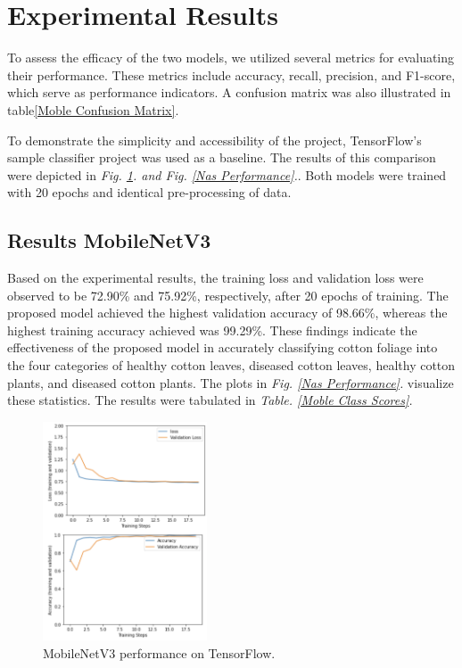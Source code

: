 \documentclass[conference]{IEEEtran}
\begin{document}
\section{Experimental Results}
To assess the efficacy of the two models, we utilized several metrics for evaluating their performance. These metrics include accuracy, recall, precision, and F1-score, which serve as performance indicators. A confusion matrix was also illustrated in table\ref{Moble Confusion Matrix}.


To demonstrate the simplicity and accessibility of the project, TensorFlow's sample classifier project was used as a baseline. The results of this comparison were depicted in \emph{Fig. \ref{Moble Perform}. and Fig. \ref{Nas Performance}.}. Both models were trained with 20 epochs and identical pre-processing of data. 

\subsection{Results MobileNetV3}
Based on the experimental results, the training loss and validation loss were observed to be 72.90\% and 75.92\%, respectively, after 20 epochs of training. The proposed model achieved the highest validation accuracy of 98.66\%, whereas the highest training accuracy achieved was 99.29\%. These findings indicate the effectiveness of the proposed model in accurately classifying cotton foliage into the four categories of healthy cotton leaves, diseased cotton leaves, healthy cotton plants, and diseased cotton plants. The plots in \emph{Fig. \ref{Nas Performance}.} visualize these statistics. The results were tabulated in  \emph{Table. \ref{Moble Class Scores}.}



\begin{figure}[h]
\centerline{\includegraphics[height=6.5cm, width = 1\linewidth]{Images/Screen_Shot_2021-05-04_at_5.27.06_PM.pdf}}
\caption{MobileNetV3 performance on TensorFlow. }
\label{Moble Perform}
\end{figure}
\end{document}
